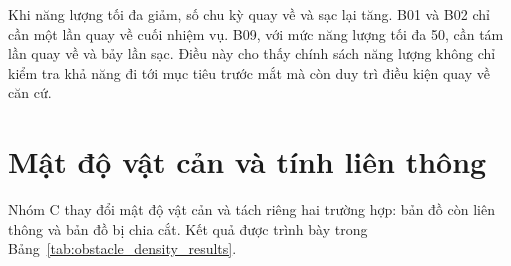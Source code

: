 \documentclass[../DoAn.tex]{subfiles}
\begin{document}
\begin{table}[H]
\centering
\caption{Kết quả nhóm B khi thay đổi năng lượng tối đa}
\label{tab:energy_capacity_results}
\scriptsize
\setlength{\tabcolsep}{3.5pt}
\renewcommand{\arraystretch}{1.08}
\end{table}

Khi năng lượng tối đa giảm, số chu kỳ quay về và sạc lại tăng. B01 và B02 chỉ cần một lần quay về cuối nhiệm vụ. B09, với mức năng lượng tối đa 50, cần tám lần quay về và bảy lần sạc. Điều này cho thấy chính sách năng lượng không chỉ kiểm tra khả năng đi tới mục tiêu trước mắt mà còn duy trì điều kiện quay về căn cứ.

\section{Mật độ vật cản và tính liên thông}

Nhóm C thay đổi mật độ vật cản và tách riêng hai trường hợp: bản đồ còn liên thông và bản đồ bị chia cắt. Kết quả được trình bày trong Bảng~\ref{tab:obstacle_density_results}.
\end{document}

